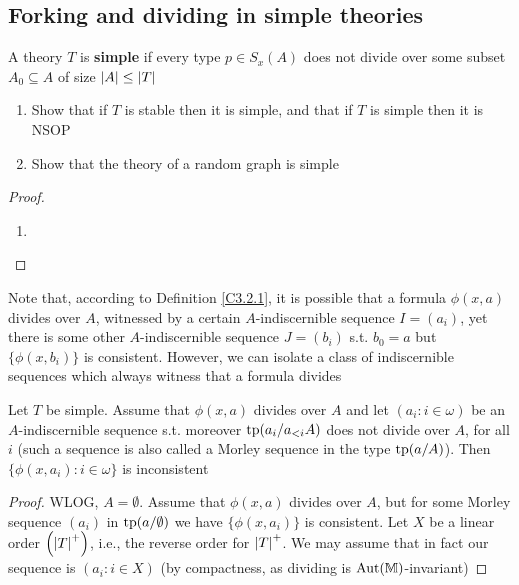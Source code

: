 \documentclass[11pt]{article}
\begin{document}
\subsection{Forking and dividing in simple theories}
\label{sec:org832fc04}
\begin{definition}[]
A theory \(T\) is \textbf{simple} if every type \(p\in S_x(A)\) does not divide over some
subset \(A_0\subseteq A\) of size \(\abs{A}\le\abs{T}\)
\end{definition}

\begin{exercise}
\label{Problem10}
\begin{enumerate}
\item Show that if \(T\) is stable then it is simple, and that if \(T\) is simple then it is NSOP
\item Show that the theory of a random graph is simple
\end{enumerate}
\end{exercise}

\begin{proof}
\begin{enumerate}
\item 
\end{enumerate}
\end{proof}

Note that, according to Definition \ref{C3.2.1}, it is possible that a formula \(\phi(x,a)\) divides
over \(A\), witnessed by a certain \(A\)-indiscernible sequence \(I=(a_i)\), yet there is some
other \(A\)-indiscernible sequence \(J=(b_i)\) s.t. \(b_0=a\) but \(\{\phi(x,b_i)\}\) is consistent.
However, we can isolate a class of indiscernible sequences which always witness that a formula
divides

\begin{lemma}
Let \(T\) be simple. Assume that \(\phi(x,a)\) divides over \(A\) and let \((a_i:i\in\omega)\) be
an \(A\)-indiscernible sequence s.t. moreover \(\operatorname{tp}(a_i/a_{<i}A)\) does not divide over \(A\), for
all \(i\) (such a sequence is also called a Morley sequence in the type \(\operatorname{tp}(a/A)\)).
Then \(\{\phi(x,a_i):i\in\omega\}\) is inconsistent
\end{lemma}

\begin{proof}
WLOG, \(A=\emptyset\). Assume that \(\phi(x,a)\) divides over \(A\), but for some Morley sequence \((a_i)\)
in \(\operatorname{tp}(a/\emptyset)\) we have \(\{\phi(x,a_i)\}\) is consistent. Let \(X\) be a linear
order \(\left( \abs{T}^+ \right)\), i.e., the reverse order for \(\abs{T}^+\). We may assume that
in fact our sequence is \((a_i:i\in X)\) (by compactness, as dividing is \(\operatorname{\text{Aut}}(\mathbb{M})\)-invariant)
\end{proof}
\end{document}
